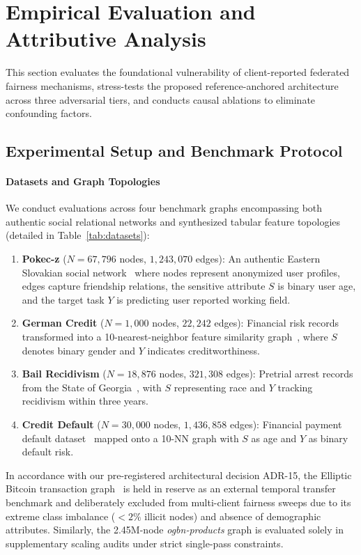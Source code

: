 \section{Empirical Evaluation and Attributive Analysis}
\label{sec:experiments}

This section evaluates the foundational vulnerability of client-reported federated fairness mechanisms, stress-tests the proposed reference-anchored architecture across three adversarial tiers, and conducts causal ablations to eliminate confounding factors.

\subsection{Experimental Setup and Benchmark Protocol}
\label{subsec:setup}

\paragraph{Datasets and Graph Topologies}
We conduct evaluations across four benchmark graphs encompassing both authentic social relational networks and synthesized tabular feature topologies (detailed in Table~\ref{tab:datasets}):
\begin{enumerate}[leftmargin=*]
    \item \textbf{Pokec-z} ($N = 67{,}796$ nodes, $1{,}243{,}070$ edges): An authentic Eastern Slovakian social network~\citep{takac2012data} where nodes represent anonymized user profiles, edges capture friendship relations, the sensitive attribute $S$ is binary user age, and the target task $Y$ is predicting user reported working field.
    \item \textbf{German Credit} ($N = 1{,}000$ nodes, $22{,}242$ edges): Financial risk records transformed into a 10-nearest-neighbor feature similarity graph~\citep{agarwal2021towards}, where $S$ denotes binary gender and $Y$ indicates creditworthiness.
    \item \textbf{Bail Recidivism} ($N = 18{,}876$ nodes, $321{,}308$ edges): Pretrial arrest records from the State of Georgia~\citep{jordan2015effect}, with $S$ representing race and $Y$ tracking recidivism within three years.
    \item \textbf{Credit Default} ($N = 30{,}000$ nodes, $1{,}436{,}858$ edges): Financial payment default dataset~\citep{yeh2009comparisons} mapped onto a 10-NN graph with $S$ as age and $Y$ as binary default risk.
\end{enumerate}
In accordance with our pre-registered architectural decision ADR-15, the Elliptic Bitcoin transaction graph~\citep{weber2019anti} is held in reserve as an external temporal transfer benchmark and deliberately excluded from multi-client fairness sweeps due to its extreme class imbalance ($<2\%$ illicit nodes) and absence of demographic attributes. Similarly, the 2.45M-node \textit{ogbn-products} graph is evaluated solely in supplementary scaling audits under strict single-pass constraints.

